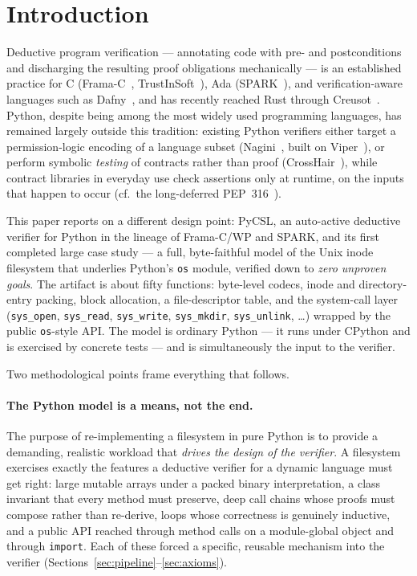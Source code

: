 \documentclass[11pt]{article}
\newcommand{\pycsl}{\textsf{PyCSL}}
\newcommand{\osmod}{\texttt{os}}
\begin{document}
\section{Introduction}

Deductive program verification --- annotating code with pre- and
postconditions and discharging the resulting proof obligations mechanically
--- is an established practice for C (Frama-C~\cite{framac,acsl},
TrustInSoft~\cite{tis}), Ada (SPARK~\cite{sparkbook,spark20}), and
verification-aware languages such as Dafny~\cite{dafny}, and has recently
reached Rust through Creusot~\cite{creusot}. Python, despite being among the
most widely used programming languages, has remained largely outside this
tradition: existing Python verifiers either target a permission-logic
encoding of a language subset (Nagini~\cite{nagini}, built on
Viper~\cite{viper}), or perform symbolic \emph{testing} of contracts rather
than proof (CrossHair~\cite{crosshair}), while contract libraries in everyday
use check assertions only at runtime, on the inputs that happen to occur
(cf.\ the long-deferred PEP~316~\cite{pep316}).

This paper reports on a different design point: \pycsl{}, an auto-active
\cite{autoactive} deductive verifier for Python in the lineage of
Frama-C/WP and SPARK, and its first completed large case study --- a full,
byte-faithful model of the Unix inode filesystem that underlies Python's
\osmod{} module, verified down to \emph{zero unproven goals}. The artifact is
about fifty functions: byte-level codecs, inode and directory-entry packing,
block allocation, a file-descriptor table, and the system-call layer
(\texttt{sys\_open}, \texttt{sys\_read}, \texttt{sys\_write},
\texttt{sys\_mkdir}, \texttt{sys\_unlink}, \ldots) wrapped by the public
\osmod{}-style API. The model is ordinary Python --- it runs under CPython and
is exercised by concrete tests --- and is simultaneously the input to the
verifier.

Two methodological points frame everything that follows.

\paragraph{The Python model is a means, not the end.}
The purpose of re-implementing a filesystem in pure Python is to provide a
demanding, realistic workload that \emph{drives the design of the verifier}.
A filesystem exercises exactly the features a deductive verifier for a
dynamic language must get right: large mutable arrays under a packed binary
interpretation, a class invariant that every method must preserve, deep call
chains whose proofs must compose rather than re-derive, loops whose
correctness is genuinely inductive, and a public API reached through method
calls on a module-global object and through \texttt{import}. Each of these
forced a specific, reusable mechanism into the verifier
(Sections~\ref{sec:pipeline}--\ref{sec:axioms}).
\end{document}
